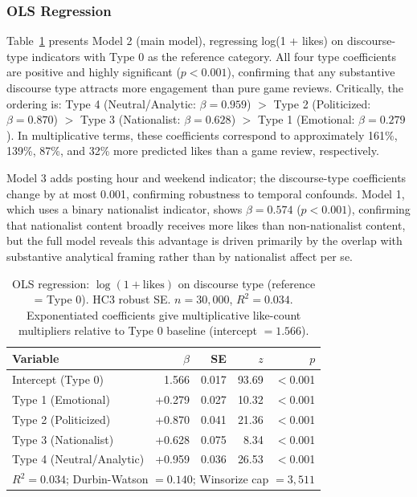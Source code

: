 \documentclass[man, 12pt, mask, floatsintext]{apa7}
\begin{document}
\subsubsection{OLS Regression}
Table~\ref{tab:regression} presents Model 2 (main model), regressing log(1 + likes) on discourse-type indicators with Type 0 as the reference category. All four type coefficients are positive and highly significant ($p < 0.001$), confirming that any substantive discourse type attracts more engagement than pure game reviews. Critically, the ordering is: Type 4 (Neutral/Analytic: $\beta = 0.959$) $>$ Type 2 (Politicized: $\beta = 0.870$) $>$ Type 3 (Nationalist: $\beta = 0.628$) $>$ Type 1 (Emotional: $\beta = 0.279$). In multiplicative terms, these coefficients correspond to approximately 161\%, 139\%, 87\%, and 32\% more predicted likes than a game review, respectively.

Model 3 adds posting hour and weekend indicator; the discourse-type coefficients change by at most 0.001, confirming robustness to temporal confounds. Model 1, which uses a binary nationalist indicator, shows $\beta = 0.574$ ($p < 0.001$), confirming that nationalist content broadly receives more likes than non-nationalist content, but the full model reveals this advantage is driven primarily by the overlap with substantive analytical framing rather than by nationalist affect per se.

\begin{table}[!htbp]
\centering
\caption{OLS regression: $\log(1 + \text{likes})$ on discourse type (reference = Type 0). HC3 robust SE. $n = 30{,}000$, $R^2 = 0.034$. Exponentiated coefficients give multiplicative like-count multipliers relative to Type 0 baseline (intercept $= 1.566$).}
\label{tab:regression}
\begin{tabular}{lrrrr}
\toprule
Variable & $\hat{\beta}$ & SE & $z$ & $p$ \\
\midrule
Intercept (Type 0) & 1.566 & 0.017 & 93.69 & $<$0.001 \\
Type 1 (Emotional) & +0.279 & 0.027 & 10.32 & $<$0.001 \\
Type 2 (Politicized) & +0.870 & 0.041 & 21.36 & $<$0.001 \\
Type 3 (Nationalist) & +0.628 & 0.075 & 8.34 & $<$0.001 \\
Type 4 (Neutral/Analytic) & +0.959 & 0.036 & 26.53 & $<$0.001 \\
\midrule
\multicolumn{5}{l}{$R^2 = 0.034$; Durbin-Watson $= 0.140$; Winsorize cap $= 3{,}511$} \\
\bottomrule
\end{tabular}
\end{table}
\end{document}
